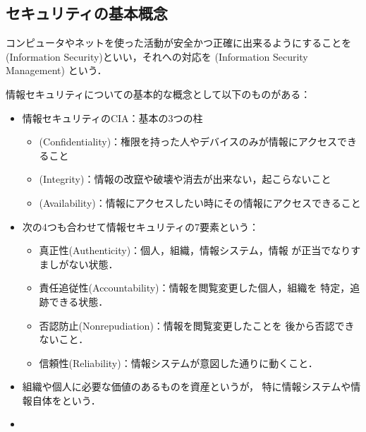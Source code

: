 \subsection{セキュリティの基本概念}
コンピュータやネットを使った活動が安全かつ正確に出来るようにすることを(Information Security)といい，それへの対応を
(Information Security Management)
という．

情報セキュリティについての基本的な概念として以下のものがある：
\begin{itemize}
   \item 
      情報セキュリティのCIA：基本の3つの柱
      \begin{itemize}
         \item {}(Confidentiality)：権限を持った人やデバイスのみが情報にアクセスできること
         \item {}(Integrity)：情報の改竄や破壊や消去が出来ない，起こらないこと
         \item {}(Availability)：情報にアクセスしたい時にその情報にアクセスできること
      \end{itemize}

   \item 
      次の4つも合わせて情報セキュリティの7要素という：
      \begin{itemize}
         \item 真正性(Authenticity)：個人，組織，情報システム，情報
            が正当でなりすましがない状態．
         \item 責任追従性(Accountability)：情報を閲覧変更した個人，組織を
            特定，追跡できる状態．
         \item 否認防止(Nonrepudiation)：情報を閲覧変更したことを
            後から否認できないこと．
         \item 信頼性(Reliability)：情報システムが意図した通りに動くこと．
      \end{itemize}

   \item 
      組織や個人に必要な価値のあるものを資産というが，
      特に情報システムや情報自体をという．

   \item   
    

\end{itemize}
